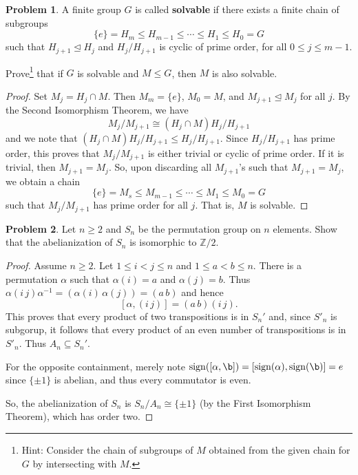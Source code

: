 \documentclass[11pt]{article}
\renewcommand{\a}{\alpha}
\newcommand{\sign}{\mathrm{sign}}
\newcommand{\nsg}{\trianglelefteq}
\theoremstyle{definition}
\newtheorem{problem}{Problem}
\begin{document}
\begin{problem} A finite group $G$ is called \textbf{solvable} if there exists a finite chain of subgroups
  $$
  \{e\} = H_m \leq H_{m-1} \leq \cdots \leq H_1 \leq H_0 = G
  $$
  such that $H_{j+1} \trianglelefteq H_j$ and $H_j/H_{j+1}$ is cyclic of prime order, for all $0 \leq j \leq m-1$. 

  Prove\footnote{Hint: Consider the chain  of subgroups of $M$ obtained from the given chain for $G$ by
    intersecting with $M$.} that if $G$ is solvable and $M \leq G$, then $M$ is also
  solvable.
    
    \end{problem}
    
    \begin{proof} Set $M_j = H_j \cap M$. Then $M_m = \{e\}$, $M_0 = M$, and $M_{j+1} \nsg M_j$ for all $j$.
      By the Second Isomorphism Theorem, we have
      $$
      M_j/M_{j+1} \cong (H_j \cap M)H_j/H_{j+1}
      $$
      and we note that $(H_j \cap M)H_j/H_{j+1} \leq H_j/H_{j+1}$. Since $H_j/H_{j+1}$ has prime order, this proves that $M_j/M_{j+1}$ is either trivial or cyclic of prime order. If it is
      trivial, then $M_{j+1} = M_j$. So, upon discarding all $M_{j+1}$'s such that $M_{j+1} = M_j$, we obtain a chain
  $$
  \{e\} = M_s \leq M_{m-1} \leq \cdots \leq M_1 \leq M_0 = G
  $$
  such that $M_j/M_{j+1}$ has prime order for all $j$. That is, $M$ is solvable.
\end{proof}

    
    
    \begin{problem} Let $n\geq 2$ and $S_n$ be the permutation group on $n$ elements. Show that the abelianization of $S_n$ is isomorphic to $\mathbb{Z}/2$.
    \end{problem} 
    
     \begin{proof} 
       Assume $n \geq 2$. Let $1 \leq i < j \leq n$ and $1 \leq a < b \leq n$. There is a permutation $\a$ such that $\a(i) = a$ and $\a(j) = b$. Thus
       $\a(i \, j) \a^{-1} = (\a(i) \, \a(j)) = (a \, b)$ and hence
       $$
       [\a, (i \, j)] =  (a \, b) (i \, j).
       $$
       This proves that every product of two transpositions is in $S_n'$ and, since $S'_n$ is subgorup, it follows that every product of an even number of transpositions is in
       $S'_n$. Thus $A_n \subseteq S_n'$.

       For the opposite containment, merely note $\sign([\a,\b]) = [\sign(\a), \sign(\b)] = e$ since $\{\pm 1\}$ is abelian, and thus every commutator is even. 

So,        the abelianization of $S_n$ is $S_n/A_n \cong \{\pm 1 \}$ (by the First Isomorphism Theorem), which has order two.
     \end{proof}
\end{document}
